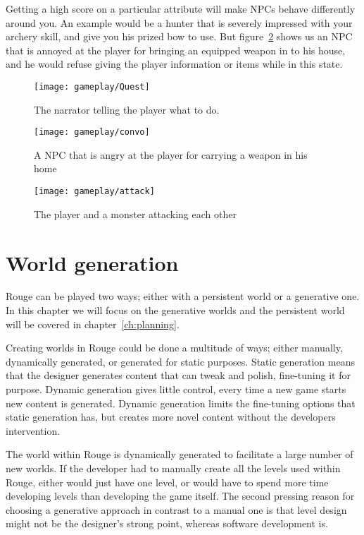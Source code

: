 Getting a high score on a particular attribute will make NPCs behave differently around you. 
An example would be a hunter that is severely impressed with your archery skill, and give you his prized bow to use. 
But figure~\ref{fig:convo} shows us an NPC that is annoyed at the player for bringing an equipped weapon in to his house, and he would refuse giving the player information or items while in this state.


\begin{figure}[p]
	\texttt{[image: gameplay/Quest]}
	\caption{The narrator telling the player what to do.}\label{fig:quest}
\end{figure}
\begin{figure}[p]
	\texttt{[image: gameplay/convo]}
	\caption{A NPC that is angry at the player for carrying a weapon in his home}\label{fig:convo}
\end{figure}
\begin{figure}[p]
	\texttt{[image: gameplay/attack]}
	\caption{The player and a monster attacking each other}\label{fig:attack}
\end{figure}

\section{World generation}
\label{sec:world_gen}
Rouge can be played two ways; either with a persistent world or a generative one. 
In this chapter we will focus on the generative worlds and the persistent world will be covered in chapter~\ref{ch:planning}.

Creating worlds in Rouge could be done a multitude of ways; either manually, dynamically generated, or generated for static purposes. 
Static generation means that the designer generates content that \he can tweak and polish, fine-tuning it for purpose.
Dynamic generation gives little control, every time a new game starts new content is generated. Dynamic generation limits the fine-tuning options that static generation has, but creates more novel content without the developers intervention.

The world within Rouge is dynamically generated to facilitate a large number of new worlds. If the developer had to manually create all the levels used within Rouge, either \he would just have one level, or \he would have to spend more time developing levels than developing the game itself. The second pressing reason for choosing a generative approach in contrast to a manual one is that level design might not be the designer's strong point, whereas software development is. 

